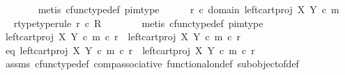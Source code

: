 \begin{isabellebody}
\ \ \ \ \ \ \isamarkupfalse%
\ {\isacharparenleft}{\kern0pt}metis\ cfunc{\isacharunderscore}{\kern0pt}type{\isacharunderscore}{\kern0pt}def\ pi{}{\isacharunderscore}{\kern0pt}m{\isacharunderscore}{\kern0pt}type{\isacharparenright}{\kern0pt}\isanewline
\ \ \ \ \isamarkupfalse%
\ {\isachardoublequoteopen}r{}\ {\isasymin}\isactrlsub c\ domain\ {\isacharparenleft}{\kern0pt}left{\isacharunderscore}{\kern0pt}cart{\isacharunderscore}{\kern0pt}proj\ X\ Y\ {\isasymcirc}\isactrlsub c\ m{\isacharparenright}{\kern0pt}{\isachardoublequoteclose}\ \isamarkupfalse%
\ \isamarkupfalse%
\ r{}{\isacharunderscore}{\kern0pt}type{\isacharbrackleft}{\kern0pt}type{\isacharunderscore}{\kern0pt}rule{\isacharbrackright}{\kern0pt}{\isacharcolon}{\kern0pt}\ {\isachardoublequoteopen}r{}\ {\isasymin}\isactrlsub c\ R{\isachardoublequoteclose}\isanewline
\ \ \ \ \ \ \isamarkupfalse%
\ {\isacharparenleft}{\kern0pt}metis\ cfunc{\isacharunderscore}{\kern0pt}type{\isacharunderscore}{\kern0pt}def\ pi{}{\isacharunderscore}{\kern0pt}m{\isacharunderscore}{\kern0pt}type{\isacharparenright}{\kern0pt}\isanewline
\ \ \ \ \isamarkupfalse%
\ {\isachardoublequoteopen}{\isacharparenleft}{\kern0pt}left{\isacharunderscore}{\kern0pt}cart{\isacharunderscore}{\kern0pt}proj\ X\ Y\ {\isasymcirc}\isactrlsub c\ m{\isacharparenright}{\kern0pt}\ {\isasymcirc}\isactrlsub c\ r{}\ {\isacharequal}{\kern0pt}\ {\isacharparenleft}{\kern0pt}left{\isacharunderscore}{\kern0pt}cart{\isacharunderscore}{\kern0pt}proj\ X\ Y\ {\isasymcirc}\isactrlsub c\ m{\isacharparenright}{\kern0pt}\ {\isasymcirc}\isactrlsub c\ r{}{\isachardoublequoteclose}\isanewline
\ \ \ \ \isamarkupfalse%
\ \isamarkupfalse%
\ eq{\isacharcolon}{\kern0pt}\ {\isachardoublequoteopen}left{\isacharunderscore}{\kern0pt}cart{\isacharunderscore}{\kern0pt}proj\ X\ Y\ {\isasymcirc}\isactrlsub c\ m\ {\isasymcirc}\isactrlsub c\ r{}\ {\isacharequal}{\kern0pt}\ left{\isacharunderscore}{\kern0pt}cart{\isacharunderscore}{\kern0pt}proj\ X\ Y\ {\isasymcirc}\isactrlsub c\ m\ {\isasymcirc}\isactrlsub c\ r{}{\isachardoublequoteclose}\isanewline
\ \ \ \ \ \ \isamarkupfalse%
\ assms\ cfunc{\isacharunderscore}{\kern0pt}type{\isacharunderscore}{\kern0pt}def\ comp{\isacharunderscore}{\kern0pt}associative\ functional{\isacharunderscore}{\kern0pt}on{\isacharunderscore}{\kern0pt}def\ subobject{\isacharunderscore}{\kern0pt}of{\isacharunderscore}{\kern0pt}def{}\ \isamarkupfalse%

\end{isabellebody}
